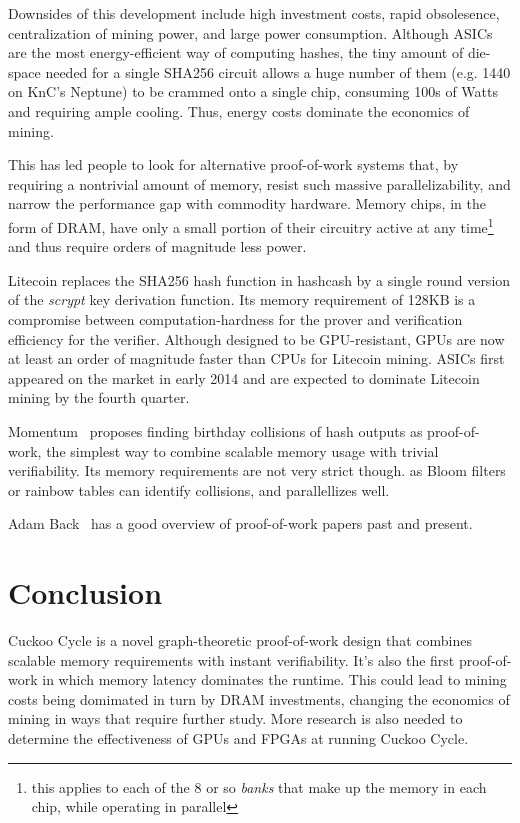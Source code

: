 \documentclass[11pt, oneside]{article}
\begin{document}
Downsides of this development include high investment costs, rapid
obsolesence, centralization of mining power, and large power consumption.
Although ASICs are the most energy-efficient way of computing hashes,
the tiny amount of die-space needed for a single SHA256 circuit allows
a huge number of them (e.g. 1440 on KnC's Neptune) to be crammed onto a
single chip, consuming 100s of Watts and requiring ample cooling.
Thus, energy costs dominate the economics of mining.

This has led people to look for alternative proof-of-work systems
that, by requiring a nontrivial amount of memory, resist such
massive parallelizability, and narrow the performance gap
with commodity hardware. Memory chips, in the form of DRAM,
have only a small portion of their circuitry active at any
time\footnote{this applies to each of the 8 or so {\em banks} that make up the memory in each chip,
while operating in parallel} and thus require orders of magnitude less power.

Litecoin replaces the SHA256 hash function in hashcash by a single round
version of the {\em scrypt} key derivation function. Its memory requirement
of 128KB is a compromise between computation-hardness for the prover and
verification efficiency for the verifier. Although designed to be
GPU-resistant, GPUs are now at least an order of magnitude faster
than CPUs for Litecoin mining. ASICs first appeared on the market in early 2014
and are expected to dominate Litecoin mining by the fourth quarter.

Momentum~\cite{larimer2013} proposes finding birthday collisions of hash
outputs as proof-of-work, the simplest way to combine scalable memory usage
with trivial verifiability. Its memory requirements are not very strict
though. as Bloom filters or rainbow tables can identify collisions, and
parallellizes well.

Adam Back~\cite{back2014} has a good overview of proof-of-work papers past
and present.

\section{Conclusion}
Cuckoo Cycle is a novel graph-theoretic proof-of-work design that combines scalable
memory requirements with instant verifiability. It's also the first proof-of-work in
which memory latency dominates the runtime.
This could lead to mining costs being domimated in turn by DRAM investments,
changing the economics of mining in ways that require further study.
More research is also needed to determine the effectiveness of GPUs and FPGAs
at running Cuckoo Cycle.
\end{document}
